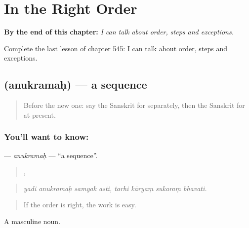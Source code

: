 
\chapter{In the Right Order}
\label{ch:sa-in-the-right-order}

\begin{chapteropening}
\textbf{By the end of this chapter:} \emph{I can talk about order, steps and exceptions.}

Complete the last lesson of chapter 545: I can talk about order, steps and exceptions.
\end{chapteropening}

\section[\texorpdfstring{\sk{अनुक्रमः} (anukramaḥ)}{अनुक्रमः (anukramaḥ)}]{ (anukramaḥ) — a sequence}

\label{lesson:SA-C545-anukramah}



\begin{quote}
Before the new one: say the Sanskrit for separately, then the Sanskrit for at present.
\end{quote}

\subsection*{You'll want to know: }
\textbf{} — \emph{anukramaḥ} — \textquotedblleft{}a sequence\textquotedblright{}.

\begin{quote}
   ,    
\end{quote}

\begin{quote}
\emph{yadi anukramaḥ samyak asti, tarhi kāryaṃ sukaraṃ bhavati.}
\end{quote}

\begin{quote}
If the order is right, the work is easy.
\end{quote}

A masculine noun.


